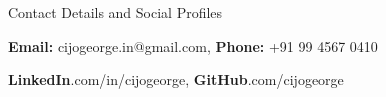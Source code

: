 \documentclass{resume} %
\begin{document}

   


\begin{rSection}{Contact Details and Social Profiles}

\begin{rPubPatContList}
\item {\bf Email:} cijogeorge.in@gmail.com, {\bf Phone:} +91 99 4567 0410
\item {\bf LinkedIn}.com/in/cijogeorge, {\bf GitHub}.com/cijogeorge
\end{rPubPatContList}

\end{rSection}





\end{document}
